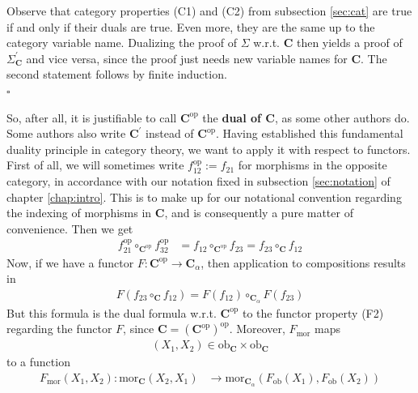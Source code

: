 \begin{prf}[Sketch]
Observe that category properties (C1) and (C2) from subsection \ref{sec:cat} are true if and only if their duals are true.
Even more, they are the same up to the category variable name.
Dualizing the proof of $\Sigma$ w.r.t. $\mathbf{C}$ then yields a proof of $\Sigma_{\mathbf{C}}^{\prime}$ and vice versa, since the proof just needs new variable names for $\mathbf{C}$.
The second statement follows by finite induction.
\\
\phantom{proven}
\hfill
$\square$
\end{prf}
So, after all, it is justifiable to call $\mathbf{C}^{\mathrm{op}}$ the \textbf{dual of $\mathbf{C}$}, as some other authors do.
Some authors also write $\mathbf{C}^{\prime}$ instead of $\mathbf{C}^{\mathrm{op}}$.
Having established this fundamental duality principle in category theory, we want to apply it with respect to functors.
First of all, we will sometimes write $f_{12}^{\mathrm{op}} := f_{21}$ for morphisms in the opposite category, in accordance with our notation fixed in subsection \ref{sec:notation} of chapter \ref{chap:intro}.
This is to make up for our notational convention regarding the indexing of morphisms in $\mathbf{C}$, and is consequently a pure matter of convenience.
Then we get
\begin{align*}
  f_{21}^{\mathrm{op}}
  \circ_{\mathbf{C}^{\mathrm{op}}}
  f_{32}^{\mathrm{op}}
  &=
  f_{12}
  \circ_{\mathbf{C}^{\mathrm{op}}}
  f_{23}
  =
  f_{23}
  \circ_{\mathbf{C}}
  f_{12}
\end{align*}
Now, if we have a functor $F \colon \mathbf{C}^{\mathrm{op}} \rightarrow \mathbf{C}_{\alpha}$, then application to compositions results in
\begin{align*}
  F(f_{23} \circ_{\mathbf{C}} f_{12})
  =
  F(f_{12})
  \circ_{\mathbf{C}_{\alpha}}
  F(f_{23})
\end{align*}
But this formula is the dual formula w.r.t. $\mathbf{C}^{\mathrm{op}}$ to the functor property (F2) regarding the functor $F$, since $\mathbf{C} = (\mathbf{C}^{\mathrm{op}})^{\mathrm{op}}$.
Moreover, $F_{\mathrm{mor}}$ maps
\begin{align*}
  (X_{1},X_{2})
  \in
  \mathrm{ob}_{\mathbf{C}}
  \times
  \mathrm{ob}_{\mathbf{C}}
\end{align*}
to a function
\begin{align*}
  F_{\mathrm{mor}}(X_{1},X_{2})
  \colon
  \mathrm{mor}_{\mathbf{C}}(X_{2},X_{1})
  &\rightarrow
  \mathrm{mor}_{\mathbf{C}_{\alpha}}
  (F_{\mathrm{ob}}(X_{1}),F_{\mathrm{ob}}(X_{2}))
\end{align*}
